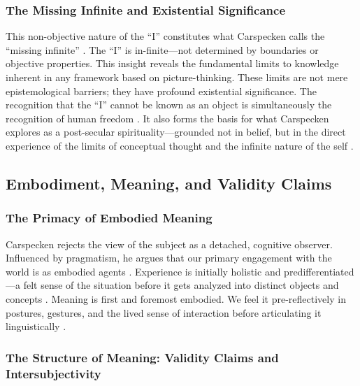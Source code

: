 \documentclass[12pt]{book}
\begin{document}
\subsubsection{The Missing Infinite and Existential Significance}\label{the-missing-infinite-and-existential-significance}

This non-objective nature of the ``I'' constitutes what Carspecken calls the ``missing infinite'' \parencite{Carspecken2018}. The ``I'' is in-finite—not determined by boundaries or objective properties. This insight reveals the fundamental limits to knowledge inherent in any framework based on picture-thinking. These limits are not mere epistemological barriers; they have profound existential significance. The recognition that the ``I'' cannot be known as an object is simultaneously the recognition of human freedom \parencite{Carspecken2018}. It also forms the basis for what Carspecken explores as a post-secular spirituality—grounded not in belief, but in the direct experience of the limits of conceptual thought and the infinite nature of the self \parencite{Carspecken2009aa}.

\subsection{Embodiment, Meaning, and Validity Claims}\label{embodiment-meaning-and-validity-claims}

\subsubsection{The Primacy of Embodied Meaning}\label{the-primacy-of-embodied-meaning}

Carspecken rejects the view of the subject as a detached, cognitive observer. Influenced by pragmatism, he argues that our primary engagement with the world is as embodied agents \parencite{Carspecken1999}. Experience is initially holistic and predifferentiated—a felt sense of the situation before it gets analyzed into distinct objects and concepts \parencite{Carspecken1995aa, Carspecken1999}. Meaning is first and foremost embodied. We feel it pre-reflectively in postures, gestures, and the lived sense of interaction before articulating it linguistically \parencite{Carspecken1995aa}.

\subsubsection{The Structure of Meaning: Validity Claims and Intersubjectivity}\label{the-structure-of-meaning-validity-claims-and-intersubjectivity}
\end{document}
